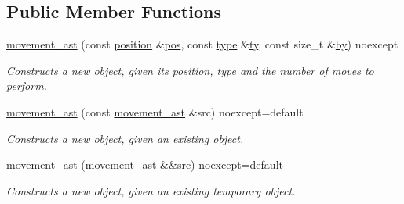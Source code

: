 \subsection*{Public Member Functions}
\begin{DoxyCompactItemize}
\item 
\hypertarget{classbfjit_1_1movement__ast_a3e0eae96553010515592ab54a983517b}{}\label{classbfjit_1_1movement__ast_a3e0eae96553010515592ab54a983517b} 
\hyperlink{classbfjit_1_1movement__ast_a3e0eae96553010515592ab54a983517b}{movement\+\_\+ast} (const \hyperlink{classbfjit_1_1position}{position} \&\hyperlink{classbfjit_1_1ast_a748b75683a33e11ad87b907ba0118c3d}{pos}, const \hyperlink{classbfjit_1_1movement__ast_a3aa723a03d76c31e1e88be817670701f}{type} \&\hyperlink{classbfjit_1_1movement__ast_ad96cbdcde5bb9ea928896fe8fccf7eae}{ty}, const size\+\_\+t \&\hyperlink{classbfjit_1_1movement__ast_ad8d951b3fb908d5f4316214d95162462}{by}) noexcept
\begin{DoxyCompactList}\small\item\em Constructs a new object, given its position, type and the number of moves to perform. \end{DoxyCompactList}\item 
\hypertarget{classbfjit_1_1movement__ast_a49f3fad998b07d9cba3daa1cab5e4e7e}{}\label{classbfjit_1_1movement__ast_a49f3fad998b07d9cba3daa1cab5e4e7e} 
\hyperlink{classbfjit_1_1movement__ast_a49f3fad998b07d9cba3daa1cab5e4e7e}{movement\+\_\+ast} (const \hyperlink{classbfjit_1_1movement__ast}{movement\+\_\+ast} \&src) noexcept=default
\begin{DoxyCompactList}\small\item\em Constructs a new object, given an existing object. \end{DoxyCompactList}\item 
\hypertarget{classbfjit_1_1movement__ast_af588abab4c5b0e5fca3c4a94260ac7b2}{}\label{classbfjit_1_1movement__ast_af588abab4c5b0e5fca3c4a94260ac7b2} 
\hyperlink{classbfjit_1_1movement__ast_af588abab4c5b0e5fca3c4a94260ac7b2}{movement\+\_\+ast} (\hyperlink{classbfjit_1_1movement__ast}{movement\+\_\+ast} \&\&src) noexcept=default
\begin{DoxyCompactList}\small\item\em Constructs a new object, given an existing temporary object. \end{DoxyCompactList}\item 
\hypertarget{classbfjit_1_1movement__ast_a145ac93e5fa7fc7bcbfddc6d6d4c0d83}{}\label{classbfjit_1_1movement__ast_a145ac93e5fa7fc7bcbfddc6d6d4c0d83} 

\end{DoxyCompactItemize}

